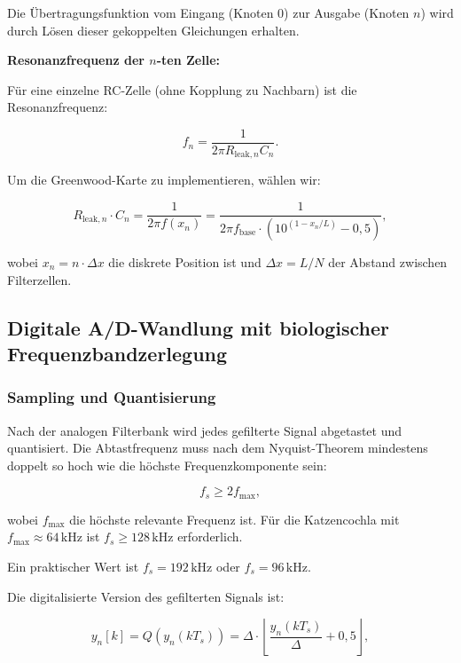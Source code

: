 ﻿\documentclass[12pt, a4paper]{article}
\theoremstyle{definition}
\theoremstyle{remark}
\begin{document}
Die Übertragungsfunktion vom Eingang (Knoten 0) zur Ausgabe (Knoten $n$) wird 
durch Lösen dieser gekoppelten Gleichungen erhalten.

\textbf{Resonanzfrequenz der $n$-ten Zelle:}

Für eine einzelne RC-Zelle (ohne Kopplung zu Nachbarn) ist die Resonanzfrequenz:

\begin{equation}
\label{eq:rc_resonance_freq}
f_n = \frac{1}{2\pi R_{\mathrm{leak},n} C_n}.
\end{equation}

Um die Greenwood-Karte zu implementieren, wählen wir:

\begin{equation}
\label{eq:rc_param_choice}
R_{\mathrm{leak},n} \cdot C_n = \frac{1}{2\pi f(x_n)} 
= \frac{1}{2\pi f_{\mathrm{base}} \cdot \left( 10^{(1-x_n/L)} - 0{,}5 \right)},
\end{equation}

wobei $x_n = n \cdot \Delta x$ die diskrete Position ist und $\Delta x = L/N$ 
der Abstand zwischen Filterzellen.

\subsection{Digitale A/D-Wandlung mit biologischer Frequenzbandzerlegung}

\subsubsection{Sampling und Quantisierung}

Nach der analogen Filterbank wird jedes gefilterte Signal abgetastet und 
quantisiert. Die Abtastfrequenz muss nach dem Nyquist-Theorem mindestens 
doppelt so hoch wie die höchste Frequenzkomponente sein:

\begin{equation}
\label{eq:nyquist_criterion}
f_s \geq 2 f_{\max},
\end{equation}

wobei $f_{\max}$ die höchste relevante Frequenz ist. Für die Katzencochla mit 
$f_{\max} \approx 64\,\mathrm{kHz}$ ist $f_s \geq 128\,\mathrm{kHz}$ erforderlich.

Ein praktischer Wert ist $f_s = 192\,\mathrm{kHz}$ oder $f_s = 96\,\mathrm{kHz}$.

Die digitalisierte Version des gefilterten Signals ist:

\begin{equation}
\label{eq:digitized_signal}
y_n[k] = Q\left( y_n(k T_s) \right) = \Delta \cdot \left\lfloor 
\frac{y_n(k T_s)}{\Delta} + 0{,}5 \right\rfloor,
\end{equation}
\end{document}
